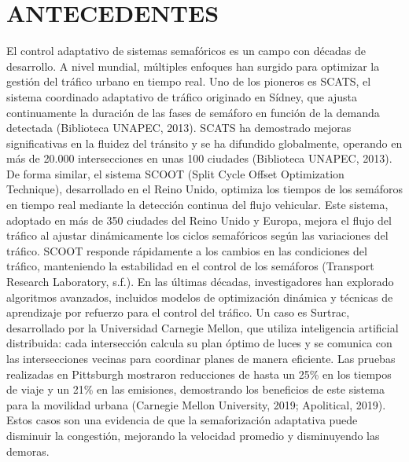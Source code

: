 \documentclass[12pt,a4paper,oneside]{report}
\begin{document}
\chapter{ANTECEDENTES}\label{capuxedtulo-1-antecedentes}

El control adaptativo de sistemas semafóricos es un campo con décadas de desarrollo. A nivel mundial, múltiples enfoques han surgido para optimizar la gestión del tráfico urbano en tiempo real. Uno de los pioneros es SCATS, el sistema coordinado adaptativo de tráfico originado en Sídney, que ajusta continuamente la duración de las fases de semáforo en función de la demanda detectada (Biblioteca UNAPEC, 2013). SCATS ha demostrado mejoras significativas en la fluidez del tránsito y se ha difundido globalmente, operando en más de 20.000 intersecciones en unas 100 ciudades (Biblioteca UNAPEC, 2013). De forma similar, el sistema SCOOT (Split Cycle Offset Optimization Technique), desarrollado en el Reino Unido, optimiza los tiempos de los semáforos en tiempo real mediante la detección continua del flujo vehicular. Este sistema, adoptado en más de 350 ciudades del Reino Unido y Europa, mejora el flujo del tráfico al ajustar dinámicamente los ciclos semafóricos según las variaciones del tráfico. SCOOT responde rápidamente a los cambios en las condiciones del tráfico, manteniendo la estabilidad en el control de los semáforos (Transport Research Laboratory, s.f.). En las últimas décadas, investigadores han explorado algoritmos avanzados, incluidos modelos de optimización dinámica y técnicas de aprendizaje por refuerzo para el control del tráfico. Un caso es Surtrac, desarrollado por la Universidad Carnegie Mellon, que utiliza inteligencia artificial distribuida: cada intersección calcula su plan óptimo de luces y se comunica con las intersecciones vecinas para coordinar planes de manera eficiente. Las pruebas realizadas en Pittsburgh mostraron reducciones de hasta un 25\% en los tiempos de viaje y un 21\% en las emisiones, demostrando los beneficios de este sistema para la movilidad urbana (Carnegie Mellon University, 2019; Apolitical, 2019). Estos casos son una evidencia de que la semaforización adaptativa puede disminuir la congestión, mejorando la velocidad promedio y disminuyendo las demoras.
\end{document}
